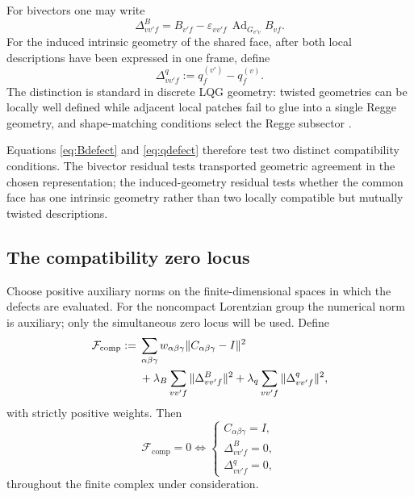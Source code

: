 \documentclass[aps,prd,reprint,nofootinbib,superscriptaddress]{revtex4-2}
\newcommand{\Ad}{\operatorname{Ad}}
\begin{document}
For bivectors one may write
\begin{equation}
\Delta^B_{vv'f}
=
B_{v'f}
-
\varepsilon_{vv'f}\,\Ad_{G_{v'v}}B_{vf}.
\label{eq:Bdefect}
\end{equation}
For the induced intrinsic geometry of the shared face, after both local descriptions have been expressed in one frame, define
\begin{equation}
\Delta^q_{vv'f}
:=
q_f^{(v')}-q_f^{(v)}.
\label{eq:qdefect}
\end{equation}
The distinction is standard in discrete LQG geometry: twisted geometries can be locally well defined while adjacent local patches fail to glue into a single Regge geometry, and shape-matching conditions select the Regge subsector \cite{FreidelSpeziale2010}.

Equations \eqref{eq:Bdefect} and \eqref{eq:qdefect} therefore test two distinct compatibility conditions. The bivector residual tests transported geometric agreement in the chosen representation; the induced-geometry residual tests whether the common face has one intrinsic geometry rather than two locally compatible but mutually twisted descriptions.

\subsection{The compatibility zero locus}

Choose positive auxiliary norms on the finite-dimensional spaces in which the defects are evaluated. For the noncompact Lorentzian group the numerical norm is auxiliary; only the simultaneous zero locus will be used. Define
\begin{align}
\mathcal F_{\mathrm{comp}}
:= {}&
\sum_{\alpha\beta\gamma}
 w_{\alpha\beta\gamma}
 \|C_{\alpha\beta\gamma}-I\|^2
\notag\\
&+
\lambda_B\sum_{vv'f}\|\Delta^B_{vv'f}\|^2
+
\lambda_q\sum_{vv'f}\|\Delta^q_{vv'f}\|^2,
\label{eq:Fcomp}
\end{align}
with strictly positive weights. Then
\begin{equation}
\boxed{
\mathcal F_{\mathrm{comp}}=0
\iff
\begin{cases}
C_{\alpha\beta\gamma}=I,\\
\Delta^B_{vv'f}=0,\\
\Delta^q_{vv'f}=0,
\end{cases}}
\label{eq:Fcompzero}
\end{equation}
throughout the finite complex under consideration.
\end{document}
